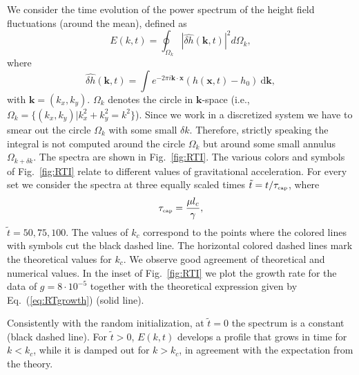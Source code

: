 We consider the time evolution of the power spectrum of the height field fluctuations (around the mean), defined as 
\begin{equation}\label{eq:powerspec}
    E(k,t) = \oint_{\Omega_k} |\hat{\delta h}(\mathbf{k},t)|^2 d\Omega_k,
\end{equation}
where
\begin{equation}\label{eq:spectra}
    \hat{\delta h}(\mathbf{k},t) = \int e^{-2\pi i\mathbf{k}\cdot\mathbf{x}} (h(\mathbf{x},t)-h_0)~\mathrm{d}\mathbf{k},
\end{equation}
with $\mathbf{k}=(k_x,k_y)$. 
$\Omega_k$ denotes the circle in $\mathbf{k}$-space (i.e., $\Omega_k = \{(k_x, k_y) | k_x^2 + k_y^2 = k^2 \}$). 
Since we work in a discretized system we have to smear out the circle $\Omega_k$ with some small $\delta k$. 
Therefore, strictly speaking the integral is not computed around the circle $\Omega_k$ but around some small annulus $\Omega_{k + \delta k}$.
The spectra are shown in Fig.~\ref{fig:RTI}. 
The various colors and symbols of Fig.~\ref{fig:RTI} relate to different values of gravitational acceleration. 
For every set we consider the spectra at three equally scaled times $\tilde{t}=t/\tau_{\mbox{\tiny{cap}}}$, where
\begin{equation}
    \tau_{\mbox{\tiny{cap}}} = \frac{\mu l_c}{\gamma},
\end{equation}
$\tilde{t}=50, 75, 100$. 
The values of $k_c$ correspond to the points where the colored lines with symbols cut the black dashed line. 
The horizontal colored dashed lines mark the theoretical values for $k_c$. 
We observe good agreement of theoretical and numerical values. 
In the inset of Fig.~\ref{fig:RTI} we plot the growth rate for the data of $g = 8\cdot 10^{-5}$ together with the theoretical expression given by Eq.~(\ref{eq:RTgrowth}) (solid line).

Consistently with the random initialization, at $\tilde{t}=0$ the spectrum is a constant (black dashed line). 
For $\tilde{t}>0$, $E(k,t)$ develops a profile that grows in time for $k<k_c$, while it is damped out for $k>k_c$, in agreement with the expectation from the theory.

